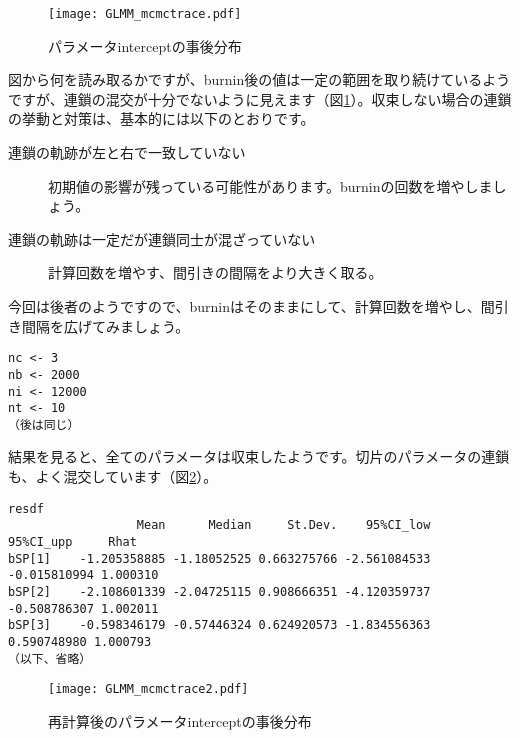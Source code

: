 \begin{figure}[htb]
\begin{center}
\graphicspath{{3_glm/figs/}}
\texttt{[image: GLMM\_mcmctrace.pdf]}\\
\caption{パラメータinterceptの事後分布}
\label{mcmctraceglmm}
\end{center}
\end{figure}

図から何を読み取るかですが、burnin後の値は一定の範囲を取り続けているようですが、連鎖の混交が十分でないように見えます（図\ref{mcmctraceglmm}）。収束しない場合の連鎖の挙動と対策は、基本的には以下のとおりです。

\begin{description}
  \item[連鎖の軌跡が左と右で一致していない]初期値の影響が残っている可能性があります。burninの回数を増やしましょう。
  \item[連鎖の軌跡は一定だが連鎖同士が混ざっていない]計算回数を増やす、間引きの間隔をより大きく取る。
\end{description}

今回は後者のようですので、burninはそのままにして、計算回数を増やし、間引き間隔を広げてみましょう。

\begin{verbatim}
nc <- 3
nb <- 2000
ni <- 12000
nt <- 10
（後は同じ）
\end{verbatim}

結果を見ると、全てのパラメータは収束したようです。切片のパラメータの連鎖も、よく混交しています（図\ref{mcmctraceglmm2}）。
\begin{verbatim}
resdf
                  Mean      Median     St.Dev.    95%CI_low    95%CI_upp     Rhat
bSP[1]    -1.205358885 -1.18052525 0.663275766 -2.561084533 -0.015810994 1.000310
bSP[2]    -2.108601339 -2.04725115 0.908666351 -4.120359737 -0.508786307 1.002011
bSP[3]    -0.598346179 -0.57446324 0.624920573 -1.834556363  0.590748980 1.000793
（以下、省略）
\end{verbatim}

\begin{figure}[htb]
\begin{center}
\graphicspath{{3_glm/figs/}}
\texttt{[image: GLMM\_mcmctrace2.pdf]}\\
\caption{再計算後のパラメータinterceptの事後分布}
\label{mcmctraceglmm2}
\end{center}
\end{figure}

